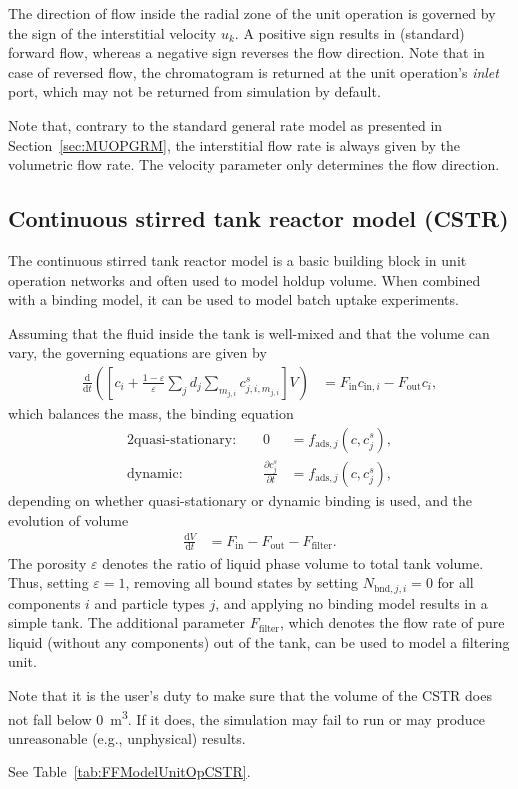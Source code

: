 The direction of flow inside the radial zone of the unit operation is governed by the sign of the interstitial velocity $u_k$.
A positive sign results in (standard) forward flow, whereas a negative sign reverses the flow direction.
Note that in case of reversed flow, the chromatogram is returned at the unit operation's \emph{inlet} port, which may not be returned from simulation by default.

Note that, contrary to the standard general rate model as presented in Section~\ref{sec:MUOPGRM}, the interstitial flow rate is always given by the volumetric flow rate.
The velocity parameter only determines the flow direction.

\subsection{Continuous stirred tank reactor model (CSTR)}\label{sec:MUOPCSTR}

The continuous stirred tank reactor model  is a basic building block in unit operation networks and often used to model holdup volume.
When combined with a binding model, it can be used to model batch uptake experiments.

Assuming that the fluid inside the tank is well-mixed and that the volume can vary, the governing equations are given by
\begin{align*}
	\frac{\mathrm{d}}{\mathrm{d}t} \left(\left[ c_i + \frac{1-\varepsilon}{\varepsilon} \sum_j d_j \sum_{m_{j,i}} c^s_{j,i,m_{j,i}} \right] V\right) &= F_{\text{in}} c_{\text{in},i} - F_{\text{out}} c_i,
\end{align*}
which balances the mass, the binding equation
\begin{alignat*}{2}
	\text{quasi-stationary: }& & 0 &= f_{\text{ads},j}\left( c, c^s_j\right), \\
	\text{dynamic: }& & \frac{\partial c^s_j}{\partial t} &= f_{\text{ads},j}\left( c, c^s_j\right),
\end{alignat*}
depending on whether quasi-stationary or dynamic binding is used, and the evolution of volume
\begin{align*}
	\frac{\mathrm{d}V}{\mathrm{d}t} &= F_{\text{in}} - F_{\text{out}} - F_{\text{filter}}.
\end{align*}
The porosity $\varepsilon$ denotes the ratio of liquid phase volume to total tank volume.
Thus, setting $\varepsilon = 1$, removing all bound states by setting $N_{\text{bnd},j,i} = 0$ for all components $i$ and particle types $j$, and applying no binding model results in a simple tank.
The additional parameter $F_{\text{filter}}$, which denotes the flow rate of pure liquid (without any components) out of the tank, can be used to model a filtering unit.

Note that it is the user's duty to make sure that the volume of the CSTR does not fall below \SI{0}{\cubic\metre}.
If it does, the simulation may fail to run or may produce unreasonable (e.g., unphysical) results.

See Table~\ref{tab:FFModelUnitOpCSTR}.
